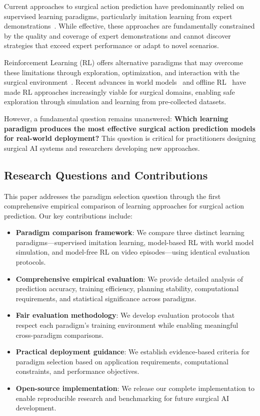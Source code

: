 \documentclass[conference]{IEEEtran}
\begin{document}
Current approaches to surgical action prediction have predominantly relied on supervised learning paradigms, particularly imitation learning from expert demonstrations~\cite{hussein2017imitation}. While effective, these approaches are fundamentally constrained by the quality and coverage of expert demonstrations and cannot discover strategies that exceed expert performance or adapt to novel scenarios.

Reinforcement Learning (RL) offers alternative paradigms that may overcome these limitations through exploration, optimization, and interaction with the surgical environment~\cite{sutton2018reinforcement}. Recent advances in world models~\cite{ha2018world} and offline RL~\cite{levine2020offline} have made RL approaches increasingly viable for surgical domains, enabling safe exploration through simulation and learning from pre-collected datasets.

However, a fundamental question remains unanswered: \textbf{Which learning paradigm produces the most effective surgical action prediction models for real-world deployment?} This question is critical for practitioners designing surgical AI systems and researchers developing new approaches.

\subsection{Research Questions and Contributions}

This paper addresses the paradigm selection question through the first comprehensive empirical comparison of learning approaches for surgical action prediction. Our key contributions include:

\begin{itemize}
\item \textbf{Paradigm comparison framework}: We compare three distinct learning paradigms—supervised imitation learning, model-based RL with world model simulation, and model-free RL on video episodes—using identical evaluation protocols.

\item \textbf{Comprehensive empirical evaluation}: We provide detailed analysis of prediction accuracy, training efficiency, planning stability, computational requirements, and statistical significance across paradigms.

\item \textbf{Fair evaluation methodology}: We develop evaluation protocols that respect each paradigm's training environment while enabling meaningful cross-paradigm comparisons.

\item \textbf{Practical deployment guidance}: We establish evidence-based criteria for paradigm selection based on application requirements, computational constraints, and performance objectives.

\item \textbf{Open-source implementation}: We release our complete implementation to enable reproducible research and benchmarking for future surgical AI development.
\end{itemize}
\end{document}
